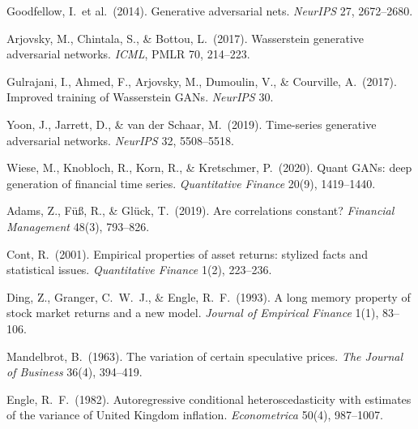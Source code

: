 \documentclass[10pt]{article}
\begin{document}
{\small
\begin{enumerate}[label={\textbf{[\arabic*]}},leftmargin=2.8em,itemsep=4pt,parsep=0pt,topsep=2pt]

\item \hypertarget{R:1}{}%
  Goodfellow, I.\ et al.\ (2014). Generative adversarial nets. \textit{NeurIPS} 27, 2672--2680.

\item \hypertarget{R:2}{}%
  Arjovsky, M., Chintala, S., \& Bottou, L.\ (2017). Wasserstein generative adversarial networks. \textit{ICML}, PMLR 70, 214--223.

\item \hypertarget{R:3}{}%
  Gulrajani, I., Ahmed, F., Arjovsky, M., Dumoulin, V., \& Courville, A.\ (2017). Improved training of Wasserstein GANs. \textit{NeurIPS} 30.

\item \hypertarget{R:4}{}%
  Yoon, J., Jarrett, D., \& van der Schaar, M.\ (2019). Time-series generative adversarial networks. \textit{NeurIPS} 32, 5508--5518.

\item \hypertarget{R:5}{}%
  Wiese, M., Knobloch, R., Korn, R., \& Kretschmer, P.\ (2020). Quant GANs: deep generation of financial time series. \textit{Quantitative Finance} 20(9), 1419--1440.

\item \hypertarget{R:6}{}%
  Adams, Z., F\"u{\ss}, R., \& Gl\"uck, T.\ (2019). Are correlations constant? \textit{Financial Management} 48(3), 793--826.

\item \hypertarget{R:7}{}%
  Cont, R.\ (2001). Empirical properties of asset returns: stylized facts and statistical issues. \textit{Quantitative Finance} 1(2), 223--236.

\item \hypertarget{R:8}{}%
  Ding, Z., Granger, C.\ W.\ J., \& Engle, R.\ F.\ (1993). A long memory property of stock market returns and a new model. \textit{Journal of Empirical Finance} 1(1), 83--106.

\item \hypertarget{R:9}{}%
  Mandelbrot, B.\ (1963). The variation of certain speculative prices. \textit{The Journal of Business} 36(4), 394--419.

\item \hypertarget{R:10}{}%
  Engle, R.\ F.\ (1982). Autoregressive conditional heteroscedasticity with estimates of the variance of United Kingdom inflation. \textit{Econometrica} 50(4), 987--1007.


\end{enumerate}}
\end{document}
